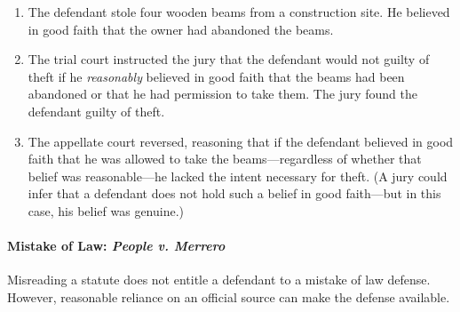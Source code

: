 \begin{enumerate}
    \item The defendant stole four wooden beams from a construction site. He 
    believed in good faith that the owner had abandoned the beams.
    \item The trial court instructed the jury that the defendant would not 
    guilty of theft if he \emph{reasonably} believed in good faith that the 
    beams had been abandoned or that he had permission to take them. The jury 
    found the defendant guilty of theft.
    \item The appellate court reversed, reasoning that if the defendant 
    believed in good faith that he was allowed to take the beams---regardless 
    of whether that belief was reasonable---he lacked the intent necessary for 
    theft. (A jury could infer that a defendant does not hold such a belief in 
    good faith---but in this case, his belief was genuine.)
\end{enumerate}

\paragraph{Mistake of Law: \emph{People v. Merrero}}

Misreading a statute does not entitle a defendant to a mistake of law defense. 
However, reasonable reliance on an official source can make the defense 
available.

